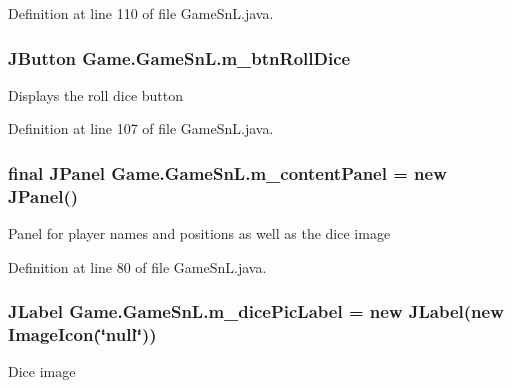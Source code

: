 Definition at line 110 of file Game\+Sn\+L.\+java.

\hypertarget{class_game_1_1_game_sn_l_acc91a4663c2f1c4ee9381a070332d7a2}{}
\subsubsection[{m\+\_\+btn\+Roll\+Dice}]{\setlength{\rightskip}{0pt plus 5cm}J\+Button Game.\+Game\+Sn\+L.\+m\+\_\+btn\+Roll\+Dice\hspace{0.3cm}{\ttfamily [private]}}\label{class_game_1_1_game_sn_l_acc91a4663c2f1c4ee9381a070332d7a2}
Displays the roll dice button 

Definition at line 107 of file Game\+Sn\+L.\+java.

\hypertarget{class_game_1_1_game_sn_l_a073ab891cd1c2854f4dd4081cfc1319c}{}
\subsubsection[{m\+\_\+content\+Panel}]{\setlength{\rightskip}{0pt plus 5cm}final J\+Panel Game.\+Game\+Sn\+L.\+m\+\_\+content\+Panel = new J\+Panel()\hspace{0.3cm}{\ttfamily [private]}}\label{class_game_1_1_game_sn_l_a073ab891cd1c2854f4dd4081cfc1319c}
Panel for player names and positions as well as the dice image 

Definition at line 80 of file Game\+Sn\+L.\+java.

\hypertarget{class_game_1_1_game_sn_l_a59399bbb046839055516f0ce733b9ba7}{}
\subsubsection[{m\+\_\+dice\+Pic\+Label}]{\setlength{\rightskip}{0pt plus 5cm}J\+Label Game.\+Game\+Sn\+L.\+m\+\_\+dice\+Pic\+Label = new J\+Label(new Image\+Icon(\char`\"{}null\char`\"{}))\hspace{0.3cm}{\ttfamily [private]}}\label{class_game_1_1_game_sn_l_a59399bbb046839055516f0ce733b9ba7}
Dice image 

